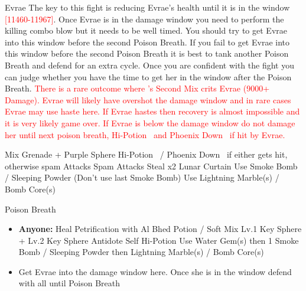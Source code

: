 \begin{battle}[32000]{Evrae}
	The key to this fight is reducing Evrae's health until it is in the window \textcolor{Red}{[11460-11967]}. Once Evrae is in the damage window you need to perform the killing combo blow but it needs to be well timed. You should try to get Evrae into this window before the second Poison Breath. If you fail to get Evrae into this window before the second Poison Breath it is best to tank another Poison Breath and defend for an extra cycle. Once you are confident with the fight you can judge whether you have the time to get her in the window after the Poison Breath.\newline
	\vspace{\baselineskip}
	\textcolor{Red}{There is a rare outcome where \rikku's Second Mix crits Evrae (9000+ Damage). Evrae will likely have overshot the damage window and in rare cases Evrae may use haste here. If Evrae hastes then recovery is almost impossible and it is very likely game over. If Evrae is below the damage window do not damage her until next poison breath, Hi-Potion \auron\ and Phoenix Down \rikku\ if hit by Evrae.}
	\vspace{\baselineskip}
	\begin{itemize}
		\switch{\tidus}{\rikku}
		\rikkuf Mix Grenade + Purple Sphere
		\kimahrif Hi-Potion \auron\ / Phoenix Down \rikku\ if either gets hit, otherwise spam Attacks
		\auronf Spam Attacks
		\rikkuf Steal x2
		\rikkuf Lunar Curtain \auron
		\rikkuf Use Smoke Bomb / Sleeping Powder (Don't use last Smoke Bomb)
		\rikkuf Use Lightning Marble(s) / Bomb Core(s)
	\end{itemize}
	\vspace{\baselineskip}
	\begin{itemize}
		\enemyf Poison Breath
	\end{itemize}
	\vspace{\baselineskip}
	\begin{itemize}
		\switch{\auron}{\tidus}
		\tidusf Phoenix Down \rikku
		\tidusf Phoenix Down \kimahri
		\item \textbf{Anyone:} Heal Petrification with Al Bhed Potion / Soft
		\rikkuf Mix Lv.1 Key Sphere + Lv.2 Key Sphere
		\switch{\tidus}{\auron}
		\auronf Antidote Self
		\kimahrif Hi-Potion \auron
		\rikkuf Use Water Gem(s) then 1 Smoke Bomb / Sleeping Powder then Lightning Marble(s) / Bomb Core(s)
		\item Get Evrae into the damage window here. Once she is in the window defend with all until Poison Breath
	\end{itemize}

\end{battle}
